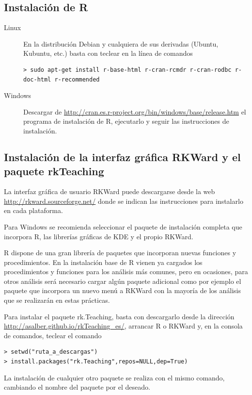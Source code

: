 \subsection{Instalación de R}
\begin{description}
\item[Linux] En la distribución Debian y cualquiera de sus derivadas (Ubuntu, Kubuntu, etc.) basta con teclear en la línea de
comandos
\begin{lstlisting}
> sudo apt-get install r-base-html r-cran-rcmdr r-cran-rodbc r-doc-html r-recommended
\end{lstlisting}
\item[Windows] Descargar de \url{http://cran.es.r-project.org/bin/windows/base/release.htm} el programa de instalación
de R, ejecutarlo y seguir las instrucciones de instalación.
\end{description}

\subsection{Instalación de la interfaz gráfica RKWard y el paquete rkTeaching}
La interfaz gráfica de usuario RKWard puede descargarse desde la web \url{http://rkward.sourceforge.net/} donde se
indican las instrucciones para instalarlo en cada plataforma.

Para Windows se recomienda seleccionar el paquete de instalación completa que incorpora R, las librerías gráficas de KDE
y el propio RKWard.

R dispone de una gran librería de paquetes que incorporan nuevas funciones y procedimientos.
En la instalación base de R vienen ya cargados los procedimientos y funciones para los análisis más comunes, pero en
ocasiones, para otros análisis será necesario cargar algún paquete adicional como por ejemplo el paquete
 que incorpora un nuevo menú a RKWard con la mayoría de los análisis que se realizarán en estas
prácticas.

Para instalar el paquete rk.Teaching, basta con descargarlo desde la dirección
\url{http://asalber.github.io/rkTeaching_es/}, arrancar R o RKWard y, en la consola de comandos, teclear el comando
\begin{lstlisting}
> setwd("ruta_a_descargas")
> install.packages("rk.Teaching",repos=NULL,dep=True)
\end{lstlisting}

La instalación de cualquier otro paquete se realiza con el mismo comando, cambiando el nombre del paquete por el
deseado.

